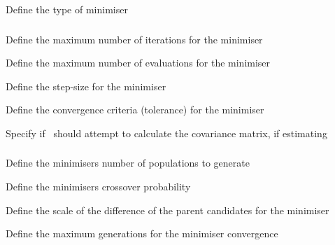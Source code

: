 
 {Define the type of minimiser}

\subsubsection[Numerical differences minimiser]{}

 {Define the maximum number of iterations for the minimiser}

 {Define the maximum number of evaluations for the minimiser}

 {Define the step-size for the minimiser}

 {Define the convergence criteria (tolerance) for the minimiser}

 {Specify if \SPM\ should attempt to calculate the covariance matrix, if estimating}

\subsubsection[Differential evolution minimiser]{}

 {Define the minimisers number of populations to generate}

 {Define the minimisers crossover probability }

 {Define the scale of the difference of the parent candidates for the minimiser}

 {Define the maximum generations for the minimiser convergence}

